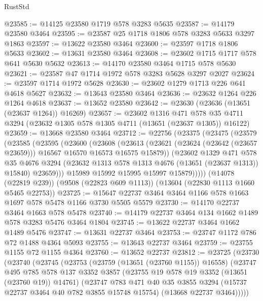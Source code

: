 \begin{lexlean}{RustStd}
\begin{coremodule}
@23585 := @14125 @23580 @1719 @578 @3283 @5635
@23587 := @14179 @23580 @3464
@23595 := @23587 @25 @1718 @1806 @578 @3283 @5633 @3297 @1863
@23597 := @13622 @23580 @3464
@23600 := @23597 @1718 @1806 @5633
@23602 := @13631 @23580 @3464
@23608 := @23602 @1715 @1717 @578 @641 @5630 @5632
@23613 := @14170 @23580 @3464 @1715 @578 @5630
@23621 := @23587 @47 @1714 @1972 @578 @3283 @5628 @3297 @2027
@23624 := @23597 @1714 @1972 @5628
@23630 := @23602 @1279 @1713 @226 @641 @4618 @5627
@23632 := @13643 @23580 @3464
@23636 := @23632 @1264 @226 @1264 @4618
@23637 := @13652 @23580
@23642 := @23630 (@23636 (@13651 (@23637 @1264)) @16269)
@23657 := @23602
    @1316
    @471
    @578
    @35
    @4711
    @3294
    (@23632 @1305 @578 @1305 @4711 (@13651 (@23637 @1305)) @16122)
@23659 := @13668 @23580 @3464
@23712 := @22756
    (@23375
      (@23475
        (@23579
          (@23585
            (@23595
              (@23600
                (@23608
                  (@23613
                    (@23621 (@23624 (@23642 (@23657 @23659))) @16567 @16570 @16573 @16575 @15879))
                  (@23602
                    @1329
                    @471
                    @578
                    @35
                    @4676
                    @3294
                    (@23632 @1313 @578 @1313 @4676 (@13651 (@23637 @1313)) @15840)
                    @23659)))
              @15989
              @15992
              @15995
              @15997
              @15879)))))
    (@14078 (@22819 @239))
    (@9508 (@22823 @609 @1113))
    (@13604 (@22830 @1113 @1660 @5465 @22753))
@23725 := @15647 @22737 @3464 @3464 @1166 @578 @1663 @1697 @578 @5478 @1166 @3730 @5505 @5579
@23730 := @14170 @22737 @3464 @1663 @578 @5478
@23740 := @14179 @22737 @3464 @134 @1662 @1489 @578 @3283 @5476 @3464 @1804
@23745 := @13622 @22737 @3464 @1662 @1489 @5476
@23747 := @13631 @22737 @3464
@23753 := @23747 @1172 @786 @72 @1488 @4364 @5093
@23755 := @13643 @22737 @3464
@23759 := @23755 @1155 @72 @1155 @4364
@23760 := @13652 @22737
@23812 := @23725
    (@23730
      (@23740
        (@23745
          (@23753
            (@23759 (@13651 (@23760 @1155)) @16558)
            (@23747
              @495
              @785
              @578
              @137
              @3352
              @3857
              (@23755 @19 @578 @19 @3352 (@13651 (@23760 @19)) @14761)
              (@23747
                @783
                @471
                @40
                @35
                @3855
                @3294
                (@15737 @22737 @3464 @40 @782 @3855 @15748 @15754)
                (@13668 @22737 @3464)))))

\end{coremodule}
\end{lexlean}
